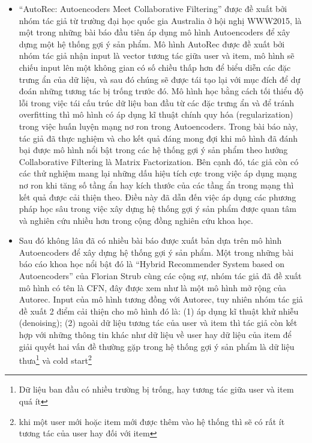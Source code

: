 \documentclass{article}[14pt]
\begin{document}
{\begin{itemize}
   \item   “AutoRec: Autoencoders Meet Collaborative Filtering”\cite{autorec} được đề xuất bởi 
   nhóm tác giả từ trường đại học quốc gia Australia  ở hội nghị WWW2015, là một 
   trong những bài báo đầu tiên áp dụng mô hình Autoencoders để xây dựng một hệ 
   thống gợi ý sản phẩm. Mô hình AutoRec được đề xuất bởi nhóm tác giả nhận input 
   là vector tương tác giữa user và item, mô hình sẽ chiếu input lên một không 
   gian có số chiều thấp hơn để biểu diễn các đặc trưng ẩn của dữ liệu, và sau 
   đó chúng sẽ được tái tạo lại với mục đích để dự đoán những tương tác bị 
   trống trước đó. Mô hình học bằng cách tối thiểu độ lỗi trong việc tái cấu 
   trúc dữ liệu ban đầu từ các đặc trưng ẩn và để tránh overfitting thì mô hình 
   có áp dụng kĩ thuật chính quy hóa (regularization) trong việc huấn luyện mạng 
   nơ ron trong Autoencoders. Trong bài báo này, tác giả đã thực nghiệm và cho 
   kết quả đáng mong đợi khi mô hình đã đánh bại được mô hình nổi bật trong các 
   hệ thống gợi ý sản phẩm theo hướng Collaborative Filtering là Matrix 
   Factorization. Bên cạnh đó, tác giả còn có các thử nghiệm mang lại những dấu 
   hiệu tích cực trong việc áp dụng mạng nơ ron khi tăng số tầng ẩn hay kích 
   thước của các tầng ẩn trong mạng thì kết quả được cải thiện theo. Điều này đã 
   dẫn đến việc áp dụng các phương pháp học sâu trong việc xây dựng hệ thống gợi 
   ý sản phẩm được quan tâm và nghiên cứu nhiều hơn trong cộng đồng nghiên cứu 
   khoa học.
   \item Sau đó không lâu đã có nhiều bài báo được xuất bản dựa trên mô hình 
   Autoencoders để xây dựng hệ thống gợi ý sản phẩm. Một trong những bài báo cáo 
   khoa học nổi bật đó là “Hybrid Recommender System based on Autoencoders” 
   \cite{cfn} của Florian Strub cùng các cộng sự, nhóm tác giả đã đề xuất mô 
   hình có tên là CFN, đây được xem như là một mô hình mở rộng của Autorec. 
   Input của mô hình tương đồng với Autorec, tuy nhiên nhóm tác giả đề xuất 2 
   điểm cải thiện cho mô hình đó là: (1) áp dụng kĩ thuật khử nhiễu 
   (denoising); (2) ngoài dữ liệu tương tác của user và item thì tác giả còn 
   kết hợp với những thông tin khác như dữ liệu về user hay dữ liệu của item để 
   giải quyết hai vấn đề thường gặp trong hệ thống gợi ý sản phẩm là dữ liệu 
   thưa\footnote{Dữ liệu ban đầu có nhiều trường bị trống, hay tương tác giữa 
   user và item quá ít} và cold start\footnote{khi một user mới hoặc item mới 
   được thêm vào hệ thống thì sẽ có rất ít tương tác của user hay đối với item 
}
\end{itemize}}
\end{document}

